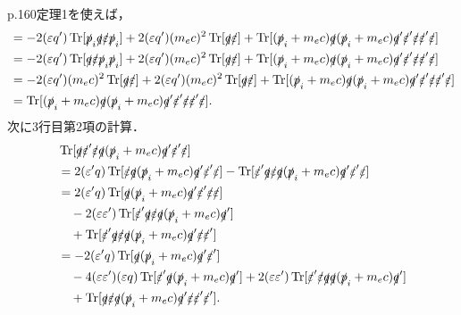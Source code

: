 p.160定理1を使えば，
\begin{align*}
  & = -2(\varepsilon q')\operatorname{Tr} [\slashed{p}_i\slashed{q}\slashed{\varepsilon}\slashed{p}_i] + 2(\varepsilon q')(m_ec)^2\operatorname{Tr} [\slashed{q}\slashed{\varepsilon}] + \operatorname{Tr} [(\slashed{p}_i+m_ec)\slashed{q}(\slashed{p}_i+m_ec)\slashed{q}'\slashed{\varepsilon}'\slashed{\varepsilon}\slashed{\varepsilon}'\slashed{\varepsilon}] \\
  & = -2(\varepsilon q')\operatorname{Tr} [\slashed{q}\slashed{\varepsilon}\slashed{p}_i\slashed{p}_i] + 2(\varepsilon q')(m_ec)^2\operatorname{Tr} [\slashed{q}\slashed{\varepsilon}] + \operatorname{Tr} [(\slashed{p}_i+m_ec)\slashed{q}(\slashed{p}_i+m_ec)\slashed{q}'\slashed{\varepsilon}'\slashed{\varepsilon}\slashed{\varepsilon}'\slashed{\varepsilon}] \\
  & = -2(\varepsilon q')(m_ec)^2\operatorname{Tr} [\slashed{q}\slashed{\varepsilon}] + 2(\varepsilon q')(m_ec)^2\operatorname{Tr} [\slashed{q}\slashed{\varepsilon}] + \operatorname{Tr} [(\slashed{p}_i+m_ec)\slashed{q}(\slashed{p}_i+m_ec)\slashed{q}'\slashed{\varepsilon}'\slashed{\varepsilon}\slashed{\varepsilon}'\slashed{\varepsilon}] \\
  & = \operatorname{Tr} [(\slashed{p}_i+m_ec)\slashed{q}(\slashed{p}_i+m_ec)\slashed{q}'\slashed{\varepsilon}'\slashed{\varepsilon}\slashed{\varepsilon}'\slashed{\varepsilon}].
\end{align*}
次に3行目第2項の計算．
\begin{align*}
  & \operatorname{Tr} [\slashed{q}\slashed{\varepsilon}'\slashed{\varepsilon}\slashed{q}(\slashed{p}_i+m_ec)\slashed{q}'\slashed{\varepsilon}'\slashed{\varepsilon}]\\
  & = 2(\varepsilon'q)\operatorname{Tr} [\slashed{\varepsilon}\slashed{q}(\slashed{p}_i+m_ec)\slashed{q}'\slashed{\varepsilon}'\slashed{\varepsilon}] - \operatorname{Tr} [\slashed{\varepsilon}'\slashed{q}\slashed{\varepsilon}\slashed{q}(\slashed{p}_i+m_ec)\slashed{q}'\slashed{\varepsilon}'\slashed{\varepsilon}]\\
  & = 2(\varepsilon'q)\operatorname{Tr} [\slashed{q}(\slashed{p}_i+m_ec)\slashed{q}'\slashed{\varepsilon}'\slashed{\varepsilon}\slashed{\varepsilon}] \\
  & \quad -2(\varepsilon\varepsilon')\operatorname{Tr} [\slashed{\varepsilon}'\slashed{q}\slashed{\varepsilon}\slashed{q}(\slashed{p}_i+m_ec)\slashed{q}']\\
  & \quad +\operatorname{Tr} [\slashed{\varepsilon}'\slashed{q}\slashed{\varepsilon}\slashed{q}(\slashed{p}_i+m_ec)\slashed{q}'\slashed{\varepsilon}\slashed{\varepsilon}']\\
  & = -2(\varepsilon'q)\operatorname{Tr} [\slashed{q}(\slashed{p}_i+m_ec)\slashed{q}'\slashed{\varepsilon}'] \\
  & \quad -4(\varepsilon\varepsilon')(\varepsilon q)\operatorname{Tr} [\slashed{\varepsilon}'\slashed{q}(\slashed{p}_i+m_ec)\slashed{q}']  + 2(\varepsilon\varepsilon')\operatorname{Tr} [\slashed{\varepsilon}'\slashed{\varepsilon}\slashed{q}\slashed{q}(\slashed{p}_i+m_ec)\slashed{q}']\\
  & \quad +\operatorname{Tr} [\slashed{q}\slashed{\varepsilon}\slashed{q}(\slashed{p}_i+m_ec)\slashed{q}'\slashed{\varepsilon}\slashed{\varepsilon}'\slashed{\varepsilon}'].
\end{align*}
